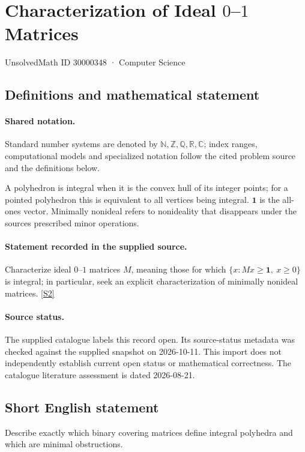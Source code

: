 \documentclass[11pt]{article}
\newcommand{\sref}[2]{\hyperlink{source:#1:#2}{[S#2]}}
\begin{document}
\setcounter{section}{30000347}
\section{Characterization of Ideal $0$–$1$ Matrices}\label{30000348}
{\small\sffamily UnsolvedMath ID 30000348 · Computer Science}
\subsection{Definitions and mathematical statement}

\paragraph{Shared notation.}Standard number systems are denoted by $\mathbb N,\mathbb Z,\mathbb Q,\mathbb R,\mathbb C$; index ranges, computational models and specialized notation follow the cited problem source and the definitions below.


A polyhedron is integral when it is the convex hull of its integer points; for a pointed polyhedron this is equivalent to all vertices being integral. $\mathbf1$ is the all-ones vector. Minimally nonideal refers to nonideality that disappears under the source\textquotesingle s prescribed minor operations.
\paragraph{Statement recorded in the supplied source.}
Characterize ideal $0$–$1$ matrices $M$, meaning those for which $\{x:Mx\geq\mathbf1,\ x\geq0\}$ is integral; in particular, seek an explicit characterization of minimally nonideal matrices. \sref{30000348}{2}
\paragraph{Source status.}
The supplied catalogue labels this record open. Its source-status metadata was checked against the supplied snapshot on 2026-10-11. This import does not independently establish current open status or mathematical correctness. The catalogue literature assessment is dated 2026-08-21.
\subsection{Short English statement}
Describe exactly which binary covering matrices define integral polyhedra and which are minimal obstructions.
\end{document}
